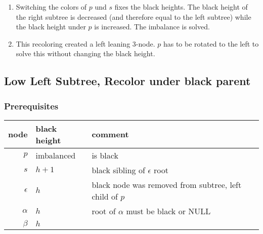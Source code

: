 \documentclass[a4paper,10pt,twoside]{article}
\begin{document}
\begin{enumerate}
\item Switching the colors of $p$ und $s$ fixes the black heights. The black
height of the right subtree is decreased (and therefore equal to the left
subtree) while the black height under $p$ is increased. The imbalance is
solved.

\begin{center}
\end{center}


\item This recoloring created a left leaning 3-node. $p$ has to be rotated to
the left to solve this without changing the black height.

\begin{center}
\end{center}


\end{enumerate}


\newpage
\subsection{Low Left Subtree, Recolor under black parent}

\subsubsection{Prerequisites}

\begin{center}
\begin{tabular}{|r||l|l|}
\hline
node		&	black height	&	comment	\\
\hline
\hline
$p$		&	imbalanced	&	is black	\\\hline
$s$		&	$h+1$	&	black sibling of $\epsilon$ root	\\\hline
$\epsilon$	&	$h$	&	black node was removed from subtree, left child of $p$	\\\hline
$\alpha$	&	$h$	&	root of $\alpha$ must be black or NULL	\\\hline
$\beta$		&	$h$	&		\\\hline
\end{tabular}
\end{center}
\end{document}
